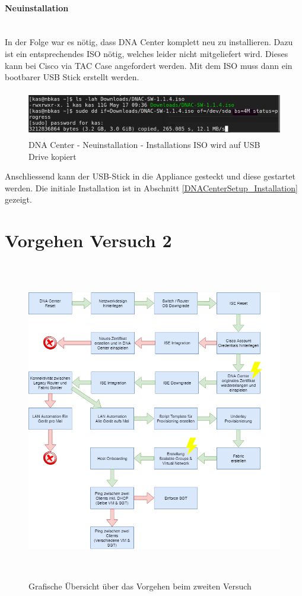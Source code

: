 \paragraph{Neuinstallation} 
~\\
In der Folge war es nötig, dass DNA Center komplett neu zu installieren. Dazu ist ein entsprechendes ISO nötig, welches leider nicht mitgeliefert wird. Dieses kann bei Cisco via TAC Case angefordert werden. Mit dem ISO muss dann ein bootbarer USB Stick erstellt werden.

\begin{figure}[H]
	\centering
	\includegraphics[height=2cm]{img/dna-center-reset-iso.png}
	\caption{DNA Center - Neuinstallation - Installations ISO wird auf USB Drive kopiert}
	\label{fig:dna-center-iso-1}
\end{figure}

Anschliessend kann der USB-Stick in die Appliance gesteckt und diese gestartet werden. Die initiale Installation ist in Abschnitt \ref{DNACenterSetup_Installation} gezeigt. 


\section{Vorgehen Versuch 2} \label{versuch2}
\begin{figure}[H]
	\centering
	\includegraphics[height=14cm]{img/vorgehen2.png}
	\caption{Grafische Übersicht über das Vorgehen beim zweiten Versuch}
	\label{fig:vorgehen-2}
\end{figure} 

